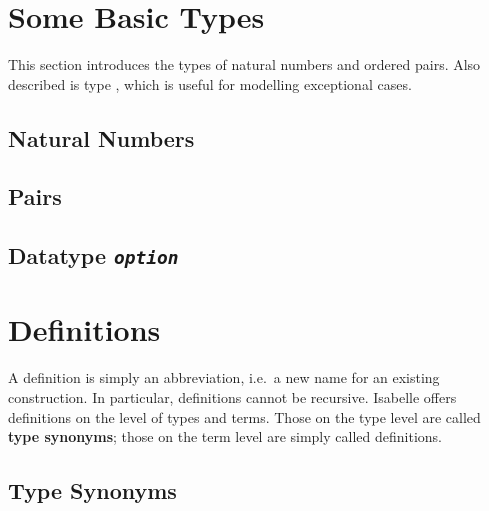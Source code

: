 \begin{exercise}\label{ex:Tree}
%
\end{exercise}






\section{Some Basic Types}

This section introduces the types of natural numbers and ordered pairs.  Also
described is type , which is useful for modelling exceptional
cases. 

\subsection{Natural Numbers}
\label{sec:nat}%






\subsection{Pairs}


\subsection{Datatype {\tt\slshape option}}
\label{sec:option}


\section{Definitions}
\label{sec:Definitions}

A definition is simply an abbreviation, i.e.\ a new name for an existing
construction. In particular, definitions cannot be recursive. Isabelle offers
definitions on the level of types and terms. Those on the type level are
called \textbf{type synonyms}; those on the term level are simply called 
definitions.


\subsection{Type Synonyms}

